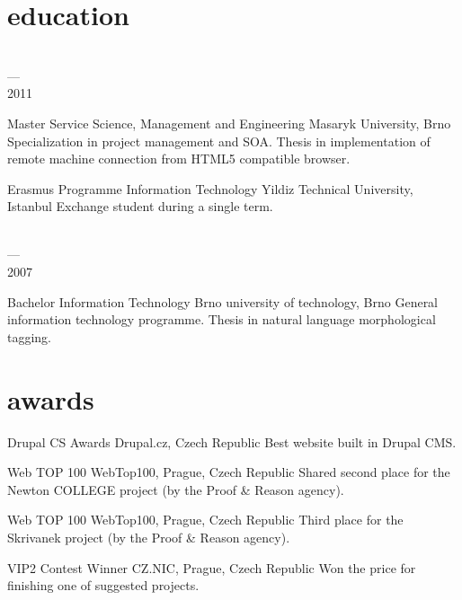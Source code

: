 \documentclass[]{friggeri-cv} %
\begin{document}
\pagebreak

\section{education}

\begin{entrylist}
  \entry
  {\parbox[t]{2cm}{ \\ --- \\ 2011}}
  {Master {\normalfont Service Science, Management and Engineering}}
  {Masaryk University, Brno}
  {
    \thesis
    {Specialization in project management and SOA.}
    {Thesis in implementation of remote machine connection from HTML5 compatible browser.}
  }
  \entry
  {\parbox[t]{2cm}{}}
  {Erasmus Programme {\normalfont Information Technology}}
  {Yildiz Technical University, Istanbul}
  {Exchange student during a single term.\medskip}
  \entry
  {\parbox[t]{2cm}{ \\ --- \\ 2007}}
  {Bachelor {\normalfont Information Technology}}
  {Brno university of technology, Brno}
  {
    \thesis
    {General information technology programme.}
    {Thesis in natural language morphological tagging.}
  }
\end{entrylist}


\section{awards}

\begin{entrylist}
\entry
{\parbox[t]{2cm}{}}
{Drupal CS Awards}
{Drupal.cz, Czech Republic}
{Best website built in Drupal CMS.}
\entry
{\parbox[t]{2cm}{}}
{Web TOP 100}
{WebTop100, Prague, Czech Republic}
{Shared second place for the Newton COLLEGE project (by the Proof \& Reason agency).}
\entry
{\parbox[t]{2cm}{}}
{Web TOP 100}
{WebTop100, Prague, Czech Republic}
{Third place for the Skrivanek project (by the Proof \& Reason agency).}
\entry
{\parbox[t]{2cm}{}}
{VIP2 Contest Winner}
{CZ.NIC, Prague, Czech Republic}
{Won the price for finishing one of suggested projects.}
\end{entrylist}
\end{document}
